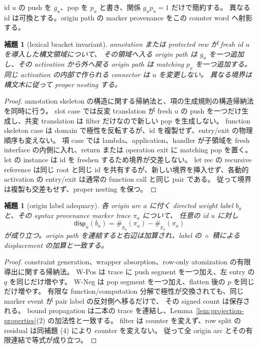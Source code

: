 \documentclass[uplatex,dvipdfmx,a4paper,10.5pt]{jsarticle}
\theoremstyle{jpplain}
\newtheorem{lemma}[definition]{補題}
\newcommand{\disp}{\mathsf{disp}}
\begin{document}
id $u$ の push を $g_u$、pop を $p_u$ と書き、関係 $g_up_u=1$ だけで簡約する。
異なる id は可換とする。origin path の marker provenance をこの counter word へ射影する。

\begin{lemma}[lexical bracket invariant]\label{inv:lexical-bracket}
annotation または protected row が fresh id $u$ を導入した構文領域について、
その領域へ入る origin path は $g_u$ を一つ追加し、その activation から外へ戻る origin path は matching $p_u$ を一つ追加する。
同じ activation の内部で作られる connector は $u$ を変更しない。
異なる境界は構文木に従って proper nesting する。
\end{lemma}

\begin{proof}
annotation skeleton の構造に関する帰納法と、項の生成規則の構造帰納法を同時に行う。
slot case では反変 translation が fresh $u$ の push を一つだけ生成し、共変 translation は filter だけなので新しい pop を生成しない。
function skeleton case は domain で極性を反転するが、id を複製せず、entry/exit の物理順序も変えない。
項 case では lambda、application、handler が子領域を fresh interface の内側に入れ、return または operation exit に matching pop を置く。
let の instance は id を freshen するため境界が交差しない。
let rec の recursive reference は同じ root と同じ id を共有するが、新しい境界を挿入せず、各動的 activation の entry/exit は通常の function call と同じ pair である。
従って境界は複製も交差もせず、proper nesting を保つ。
\end{proof}

\begin{lemma}[origin label adequacy]\label{lem:origin-label-adequacy}
各 origin arc $a$ に付く directed weight label $b_a$ と、その syntax provenance marker trace $\pi_a$ について、
任意の id $u$ に対し
\[
  \disp_u(b_a)=\#_{g_u}(\pi_a)-\#_{p_u}(\pi_a)
\]
が成り立つ。origin path を連結すると右辺は加算され、label の $\diamond$ 積による displacement の加算と一致する。
\end{lemma}

\begin{proof}
constraint generation、wrapper absorption、row-only atomization の有限導出に関する帰納法。
W-Pos は trace に push segment を一つ加え、左 entry の $q$ を同じだけ増やす。
W-Neg は pop segment を一つ加え、flatten 後の $p$ を同じだけ増やす。
有限な function/computation 分解で極性が交換されても、同じ marker event が pair label の反対側へ移るだけで、
その signed count は保存される。
bound propagation は二本の trace を連結し、Lemma~\ref{lem:projection-properties}(2) の加法性と一致する。
filter は counter を変えず、row split の residual は同補題 (4) により counter を変えない。
従って全 origin arc とその有限連結で等式が成り立つ。
\end{proof}
\end{document}
